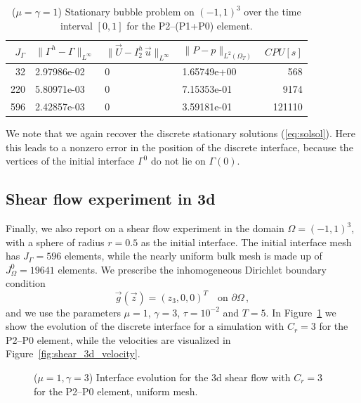 \documentclass[a4paper,12pt,onecolumn]{article}
\newcommand{\errorXx}{\|\Gamma^h - \Gamma\|_{L^\infty}}
\newcommand{\errorUu}[1]{\|\vec U - I^h_{#1}\,\vec u\|_{L^\infty}}
\newcommand{\LerrorPp}{\|P - p\|_{L^2(\Omega_T)}}
\begin{document}
\begin{table}
\center
\begin{tabular}{rlllr}
\hline
$J_\Gamma$ & $\errorXx$ & $\errorUu2$ & $\LerrorPp$ & $CPU[s]$ \\
\hline
 32 & 2.97986e-02 & 0 & 1.65749e+00 &   568 \\
220 & 5.80971e-03 & 0 & 7.15353e-01 &  9174 \\
596 & 2.42857e-03 & 0 & 3.59181e-01 & 121110 \\
\hline
\end{tabular}
\caption{($\mu=\gamma=1$) Stationary bubble problem on $(-1,1)^3$ over the time 
interval $[0,1]$ for the P2--(P1+P0) element.}
\label{tab:bubble3Dp2p1p0}
\end{table}

We note that we again recover the discrete stationary solutions 
(\ref{eq:solsol}). Here this leads to a nonzero error in the position of the
discrete interface, because the vertices of the initial interface $\Gamma^0$ do
not lie on $\Gamma(0)$.

\subsection{Shear flow experiment in 3d}
Finally, we also report on a shear flow experiment in the domain 
$\Omega=(-1,1)^3$, with a sphere of radius $r=0.5$ as the initial interface. 
The initial interface mesh has $J_\Gamma = 596$ elements, while the nearly 
uniform bulk mesh is made up of $J_\Omega^0 = 19641$ elements. We prescribe the 
inhomogeneous Dirichlet boundary condition
\begin{equation*}
\vec g(\vec z)=(z_3,0,0)^T\quad \mbox{on }\partial\Omega\,,
\end{equation*}
and we use the parameters $\mu=1$, $\gamma=3$, $\tau=10^{-2}$ and $T=5$. 
In Figure~\ref{fig:shear_3d} we show the evolution of the discrete interface
for a simulation with $C_r=3$ for the P2--P0 element, while the velocities
are visualized in Figure~\ref{fig:shear_3d_velocity}.
\begin{figure}[htbp]
\centering
{}
\caption{($\mu=1,\gamma=3$) Interface evolution for the 3d shear flow with 
$C_r=3$ for the P2--P0 element, uniform mesh.}
\label{fig:shear_3d}
\end{figure}
\end{document}
